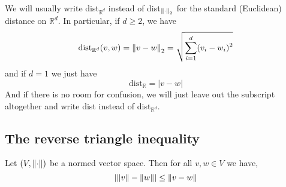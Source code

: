 \begin{remark}
    We will usually write dist$_{\mathbb{R}^d}$ instead of dist$_{\norm{\cdot}_2}$ for the standard (Euclidean) distance on $\mathbb{R}^d$.
    In particular, if $d \ge 2$, we have
    $$\text{dist}_{\mathbb{R}^d}(v,w) = \norm{v-w}_2 = \sqrt{\displaystyle\sum_{i=1}^d(v_i-w_i)^2} $$
    and if $d = 1$ we just have
    $$\text{dist}_\mathbb{R} = |v - w|$$
    And if there is no room for confusion, we will just leave out the subscript altogether and write dist instead of dist$_{\mathbb{R}^d}$.
\end{remark}

\subsection{The reverse triangle inequality}
\begin{lemma}
    Let $(V, \norm{\cdot})$ be a normed vector space. 
    Then for all $v,w \in V$ we have,
    $$|\norm{v} - \norm{w}| \le \norm{v - w}$$
\end{lemma}
